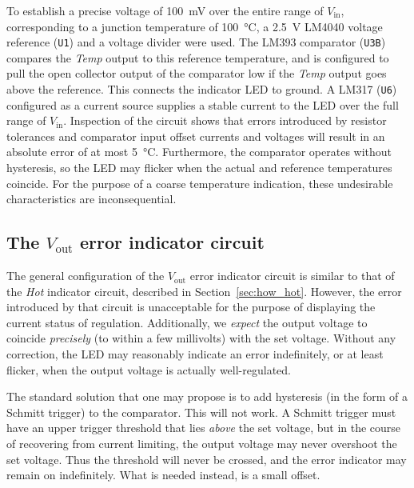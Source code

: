 \documentclass[letterpaper,twocolumn,10pt]{article}
\newcommand{\refdes}[1]{\texttt{#1}}
\begin{document}
To establish a precise voltage of \SI{100}{\mV} over the entire range of
$V_\text{in}$, corresponding to a junction temperature of \SI{100}{\celsius}, a
\SI{2.5}{\V} LM4040 voltage reference (\refdes{U1}) and a voltage divider were
used. The LM393 comparator (\refdes{U3B}) compares the \textit{Temp} output to
this reference temperature, and is configured to pull the open collector output
of the comparator low if the \textit{Temp} output goes above the reference. This
connects the indicator LED to ground. A LM317 (\refdes{U6}) configured as a
current source supplies a stable current to the LED over the full range of
$V_\text{in}$. Inspection of the circuit shows that errors introduced by
resistor tolerances and comparator input offset currents and voltages will
result in an absolute error of at most \SI{5}{\celsius}. Furthermore, the
comparator operates without hysteresis, so the LED may flicker when the
actual and reference temperatures coincide. For the purpose of a coarse
temperature indication, these undesirable characteristics are inconsequential.

\subsection{The $V_\text{out}$ error indicator circuit}\label{sec:how_offset}

The general configuration of the $V_\text{out}$ error indicator circuit is
similar to that of the \textit{Hot} indicator circuit, described in
Section~\ref{sec:how_hot}. However, the error introduced by that circuit is
unacceptable for the purpose of displaying the current status of regulation.
Additionally, we \emph{expect} the output voltage to coincide \emph{precisely}
(to within a few millivolts) with the set voltage. Without any correction, the
LED may reasonably indicate an error indefinitely, or at least flicker, when the
output voltage is actually well-regulated.

The standard solution that one may propose is to add hysteresis (in the form of
a Schmitt trigger) to the comparator. This will not work. A Schmitt trigger must
have an upper trigger threshold that lies \emph{above} the set voltage, but in
the course of recovering from current limiting, the output voltage may never
overshoot the set voltage. Thus the threshold will never be crossed, and the
error indicator may remain on indefinitely. What is needed instead, is a small
offset.
\end{document}
